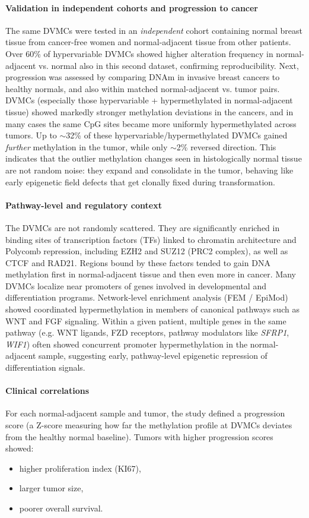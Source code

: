 \documentclass[10pt]{extarticle}
\begin{document}
\paragraph{Validation in independent cohorts and progression to cancer}
The same DVMCs were tested in an \textit{independent} cohort containing normal breast tissue from cancer-free women and normal-adjacent tissue from other patients. Over 60\% of hypervariable DVMCs showed higher alteration frequency in normal-adjacent vs. normal also in this second dataset, confirming reproducibility.  
Next, progression was assessed by comparing DNAm in invasive breast cancers to healthy normals, and also within matched normal-adjacent vs. tumor pairs. DVMCs (especially those hypervariable + hypermethylated in normal-adjacent tissue) showed markedly stronger methylation deviations in the cancers, and in many cases the same CpG sites became more uniformly hypermethylated across tumors. Up to $\sim$32\% of these hypervariable/hypermethylated DVMCs gained \textit{further} methylation in the tumor, while only $\sim$2\% reversed direction. This indicates that the outlier methylation changes seen in histologically normal tissue are not random noise: they expand and consolidate in the tumor, behaving like early epigenetic field defects that get clonally fixed during transformation.

\paragraph{Pathway-level and regulatory context}
The DVMCs are not randomly scattered. They are significantly enriched in binding sites of transcription factors (TFs) linked to chromatin architecture and Polycomb repression, including EZH2 and SUZ12 (PRC2 complex), as well as CTCF and RAD21. Regions bound by these factors tended to gain DNA methylation first in normal-adjacent tissue and then even more in cancer. Many DVMCs localize near promoters of genes involved in developmental and differentiation programs. Network-level enrichment analysis (FEM / EpiMod) showed coordinated hypermethylation in members of canonical pathways such as WNT and FGF signaling. Within a given patient, multiple genes in the same pathway (e.g. WNT ligands, FZD receptors, pathway modulators like \textit{SFRP1}, \textit{WIF1}) often showed concurrent promoter hypermethylation in the normal-adjacent sample, suggesting early, pathway-level epigenetic repression of differentiation signals.

\paragraph{Clinical correlations}
For each normal-adjacent sample and tumor, the study defined a progression score (a Z-score measuring how far the methylation profile at DVMCs deviates from the healthy normal baseline). Tumors with higher progression scores showed: 
\begin{itemize}[label=-]
  \item higher proliferation index (KI67),
  \item larger tumor size,
  \item poorer overall survival.
\end{itemize}
\end{document}
